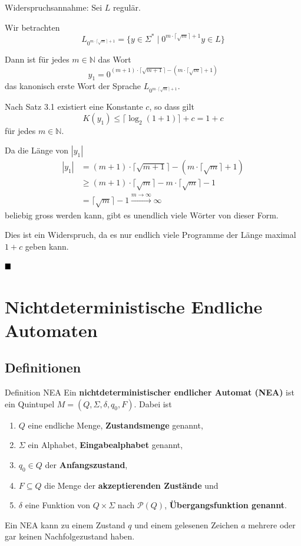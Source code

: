 \documentclass[a4paper, 11pt]{article}
\def\N{\mathbb{N}}
\begin{document}
    Widerspruchsannahme: Sei $L$ regulär.

   Wir betrachten $$L_{0^{m\cdot \lceil \sqrt{m}\rceil + 1}} = \{y \in \Sigma^* \mid 0^{m\cdot \lceil \sqrt{m}\rceil + 1}y \in L\}$$

   Dann ist für jedes $m \in \N$ das Wort $$y_1 = 0^{(m+1)\cdot \lceil \sqrt{m+1}\rceil - (m\cdot \lceil \sqrt{m}\rceil + 1)}$$
   das kanonisch erste Wort der Sprache $L_{0^{m\cdot \lceil \sqrt{m}\rceil + 1}}$.

    Nach Satz 3.1 existiert eine Konstante $c$, so dass gilt
    $$K(y_1) \leq \lceil\log_2(1+1)\rceil + c = 1 + c$$
    für jedes $m \in \N$.

    Da die Länge von $|y_1|$
    \begin{align*}
        |y_1| &= (m+1)\cdot \lceil \sqrt{m+1}\rceil - (m\cdot \lceil \sqrt{m}\rceil + 1)\\
             &\geq (m+1) \cdot  \lceil \sqrt{m}\rceil -m\cdot \lceil \sqrt{m}\rceil -1\\
             &= \lceil \sqrt{m}\rceil -1 \overset{m \to \infty}{\longrightarrow} \infty
    \end{align*}
    beliebig gross werden kann, gibt es unendlich viele Wörter von dieser Form.

    Dies ist ein Widerspruch, da es nur endlich viele Programme der Länge maximal $1+c$ geben kann.

    $\hfill\blacksquare$


\section{Nichtdeterministische Endliche Automaten}

\subsection{Definitionen}
    \begin{mainbox}{Definition NEA}
        Ein \textbf{nichtdeterministischer endlicher Automat (NEA)} ist ein Quintupel $M = (Q, \Sigma, \delta, q_0, F)$. Dabei ist 
        \begin{enumerate}[label= (\roman*)]
            \item $Q$ eine endliche Menge, \textbf{Zustandsmenge} genannt,
            \item $\Sigma$ ein Alphabet, \textbf{Eingabealphabet} genannt,
            \item $q_0 \in Q$ der \textbf{Anfangszustand},
            \item $F \subseteq Q$ die Menge der \textbf{akzeptierenden Zustände} und 
            \item $\delta$ eine Funktion von $Q \times \Sigma$ nach $\mathcal{P}(Q)$, \textbf{Übergangsfunktion genannt}.
        \end{enumerate}
    \end{mainbox}
    Ein NEA kann zu einem Zustand $q$ und einem gelesenen Zeichen $a$ mehrere oder gar keinen Nachfolgezustand haben.
\end{document}

